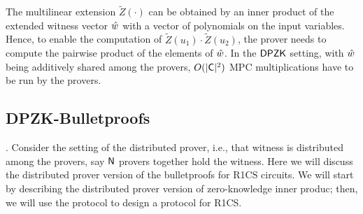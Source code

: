 The multilinear extension $\tilde{Z}(\cdot)$ can be obtained by an inner product of the extended witness vector $\hat{w}$ with a vector of polynomials on the input variables. Hence, to enable the computation of $\tilde{Z}(u_1) \cdot \tilde{Z}(u_2)$, the prover needs to compute the pairwise product of the elements of $\hat{w}$. In the $\mathsf{DPZK}$ setting, with $\hat{w}$ being additively shared among the provers, $O(|\mathsf{C}|^2)$ MPC multiplications have to be run by the provers. 

\subsection{DPZK-Bulletproofs}\label{subsec:bulletproofs}
.
Consider the setting of the distributed prover, i.e., that witness is distributed among the provers, say $\mathsf{N}$ provers together hold the witness. Here we will discuss the distributed prover version of the bulletproofs for R1CS circuits. We will start by describing the distributed prover version of zero-knowledge inner produc; then, we will use the protocol to design a protocol for R1CS.

